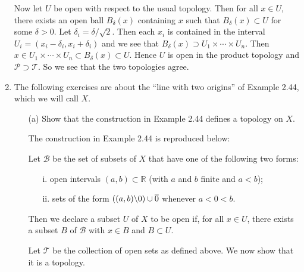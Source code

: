 \documentclass[12pt]{article}
\begin{document}
\begin{enumerate}
\begin{mybox}
    \vspace*{2mm}
    Now let $U$ be open with respect to the usual
    topology. Then for all $x\in U$, there exists an
    open ball $B_\delta(x)$ containing $x$ such that
    $B_\delta(x)\subset U$ for some $\delta>0$.
    Let $\delta_i = \delta/\sqrt{2}$. Then each $x_i$
    is contained in the interval
    $U_i= (x_i-\delta_i,x_i+\delta_i)$ and we see that
    $B_\delta(x) \supset U_1\times \cdots 
    \times U_n$. Then $x\in U_1\times \cdots 
    \times U_n \subset B_\delta(x) \subset U$. Hence
    $U$ is open in the product topology and
     $\mathscr{P}\supset \mathscr{T}$. So we see that the
     two topologies agree.

\end{mybox}
 
 
\item The following exercises are about the
“line with two origins” of Example 2.44, which we will
call $X$.
\begin{enumerate}
    \item[(a)] Show that the construction in Example 2.44
        defines a topology on $X$.
        \begin{mybox}

            The construction in Example 2.44 is reproduced
            below:

            \vspace*{2mm}
            Let $\mathscr{B}$ be the set of subsets of $X$
            that have one of the following two forms:
        \begin{enumerate}
            \item[i.] open intervals $(a, b)
                \subset \mathbb{R}$ (with $a$ and $b$
                finite and $a < b$);
            \item[ii.] sets of the form $((a, b)
                \char`\\{0})\cup {\overline{0}}$
                whenever $a < 0 < b$.
        \end{enumerate}
        Then we declare a subset $U$ of $X$ to be open
        if, for all $x\in U$, there exists a
        subset $B$ of $\mathscr{B}$ with $x \in B$
        and $B \subset U$.

        \vspace*{2mm}
        Let $\mathscr{T}$ be the collection of open sets
        as defined above. We now show that it is a topology.


\end{mybox}
\end{enumerate}
\end{enumerate}
\end{document}
